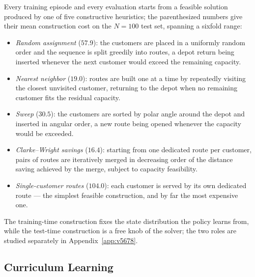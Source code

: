\documentclass[letterpaper]{article} %
\begin{document}
Every training episode and every evaluation starts from a feasible solution produced by one of five constructive heuristics; the parenthesized numbers give their mean construction cost on the $N = 100$ test set, spanning a sixfold range:
\begin{itemize}
    \item \textit{Random assignment} ($57.9$): the customers are placed in a uniformly random order and the sequence is split greedily into routes, a depot return being inserted whenever the next customer would exceed the remaining capacity.
    \item \textit{Nearest neighbor} ($19.0$): routes are built one at a time by repeatedly visiting the closest unvisited customer, returning to the depot when no remaining customer fits the residual capacity.
    \item \textit{Sweep} ($30.5$): the customers are sorted by polar angle around the depot and inserted in angular order, a new route being opened whenever the capacity would be exceeded.
    \item \textit{Clarke--Wright savings} ($16.4$): starting from one dedicated route per customer, pairs of routes are iteratively merged in decreasing order of the distance saving achieved by the merge, subject to capacity feasibility.
    \item \textit{Single-customer routes} ($104.0$): each customer is served by its own dedicated route --- the simplest feasible construction, and by far the most expensive one.
\end{itemize}
The training-time construction fixes the state distribution the policy learns from, while the test-time construction is a free knob of the solver; the two roles are studied separately in Appendix~\ref{app:v5678}.

\subsection{Curriculum Learning}
\label{app:curriculum}
\end{document}
